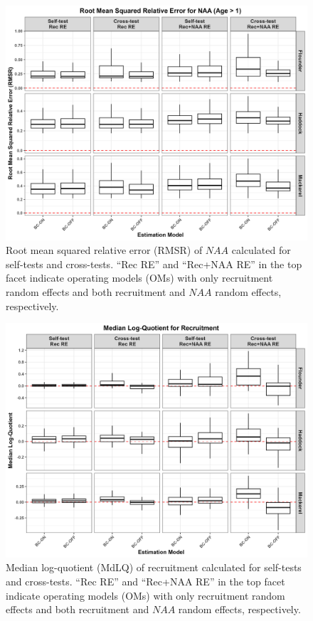\documentclass[
  12pt,
]{article}
\begin{document}
\begin{figure}[H]
    \centering
    \includegraphics[width=\textwidth]{Revised_Figures&Tables/RMSR_NAA.PNG}
    \caption{Root mean squared relative error (RMSR) of $NAA$ calculated for self-tests and cross-tests. ``Rec RE'' and ``Rec+NAA RE'' in the top facet indicate operating models (OMs) with only recruitment random effects and both recruitment and $NAA$ random effects, respectively.}
    \label{fig:supp_NAA_RMSR}
\end{figure}

\begin{figure}[H]
    \centering
    \includegraphics[width=\textwidth]{Revised_Figures&Tables/MdLQ_Rec.PNG}
    \caption{Median log-quotient (MdLQ) of recruitment calculated for self-tests and cross-tests. ``Rec RE'' and ``Rec+NAA RE'' in the top facet indicate operating models (OMs) with only recruitment random effects and both recruitment and $NAA$ random effects, respectively.}
    \label{fig:supp_Rec_MdLQ}
\end{figure}
\end{document}
